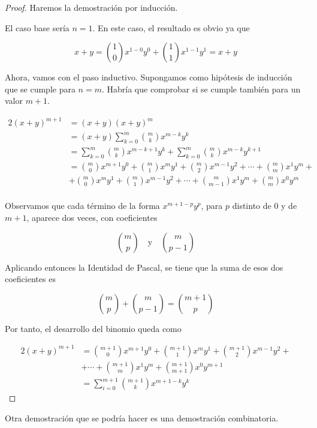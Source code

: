 \begin{proof}
  Haremos la demostración por inducción.

  El caso base sería $n = 1$. En este caso, el resultado es obvio ya que

  $$ x + y = {1 \choose 0} x^{1-0} y^0 + {1 \choose 1} x^{1-1} y^1 = x + y
  $$

  Ahora, vamos con el paso inductivo. Supongamos como hipótesis de inducción
  que se cumple para $n = m$. Habría que comprobar si se cumple también para
  un valor $m+1$.

  \begin{alignat*}{2}
    (x + y)^{m+1}
      &= (x + y)(x + y)^m \\
      &= (x + y)\sum_{k=0}^m {m \choose k}  x^{m-k} y^k \\
      &= \sum_{k=0}^m {m \choose k}  x^{m-k+1} y^k + \sum_{k=0}^m {m \choose
        k}  x^{m-k} y^{k+1} \\
      &= {m \choose 0} x^{m+1} y^0 + {m \choose 1} x^m y^1 + {m \choose 2}
        x^{m-1} y^2 + \cdots + {m \choose m} x^1 y^m + \\
      &+ {m \choose 0} x^m y^1 + {m \choose 1} x^{m-1} y^2 + \cdots + {m
        \choose m-1} x^1 y^m + {m \choose m} x^0 y^{m} \\
  \end{alignat*}

  Observamos que cada término de la forma $x^{m+1-p} y^p$, para $p$ distinto
  de 0 y de $m+1$, aparece dos veces, con coeficientes

  $$ {m \choose p} \quad \text{y} \quad {m \choose p-1} $$

  Aplicando entonces la Identidad de Pascal, se tiene que la suma de esos
  dos coeficientes es

  $$ {m \choose p} + {m \choose p-1} = {m+1 \choose p} $$

  \noindent Por tanto, el desarrollo del binomio queda como

  \begin{alignat*}{2}
    (x + y)^{m+1}
    &= {m+1 \choose 0} x^{m+1} y^0 + {m+1 \choose 1} x^m y^1 + {m+1 \choose
      2} x^{m-1} y^2 + \\
    &+ \cdots + {m+1 \choose m} x^1 y^m + {m+1 \choose m+1} x^0 y^{m+1} \\
    &= \sum_{i=0}^{m+1} {m+1 \choose k} x^{m+1-k} y^k
  \end{alignat*}
\end{proof}

Otra demostración que se podría hacer es una demostración combinatoria.

